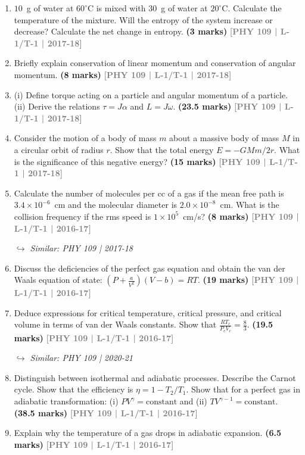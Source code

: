 \documentclass[12pt,a3paper]{article}
\newcommand{\yr}[1]{\hfill\textcolor{gray}{\small\textbf{[#1]}}}
\newcommand{\mk}[1]{\textcolor{orange!70!black}{\small\textbf{(#1 marks)}}}
\newcommand{\variant}[1]{\par\vspace{1pt}\textcolor{blue!50!black}%
  {\footnotesize\textit{$\hookrightarrow$ Similar: #1}}}
\begin{document}
\begin{enumerate}
\item $10$~g of water at $60^\circ$C is mixed with $30$~g of water at $20^\circ$C. Calculate the temperature of the mixture. Will the entropy of the system increase or decrease? Calculate the net change in entropy.
\mk{3} \yr{PHY 109 | L-1/T-1 | 2017-18}

\item Briefly explain conservation of linear momentum and conservation of angular momentum.
\mk{8} \yr{PHY 109 | L-1/T-1 | 2017-18}

\item (i) Define torque acting on a particle and angular momentum of a particle. (ii) Derive the relations $\tau = J\alpha$ and $L = J\omega$.
\mk{23.5} \yr{PHY 109 | L-1/T-1 | 2017-18}

\item Consider the motion of a body of mass $m$ about a massive body of mass $M$ in a circular orbit of radius $r$. Show that the total energy $E = -GMm/2r$. What is the significance of this negative energy?
\mk{15} \yr{PHY 109 | L-1/T-1 | 2017-18}

\item Calculate the number of molecules per cc of a gas if the mean free path is $3.4\times10^{-6}$~cm and the molecular diameter is $2.0\times10^{-8}$~cm. What is the collision frequency if the rms speed is $1\times10^5$~cm/s?
\mk{8} \yr{PHY 109 | L-1/T-1 | 2016-17}
\variant{PHY 109 | 2017-18}

\item Discuss the deficiencies of the perfect gas equation and obtain the van der Waals equation of state: $\left(P + \frac{a}{V^2}\right)(V - b) = RT$.
\mk{19} \yr{PHY 109 | L-1/T-1 | 2016-17}

\item Deduce expressions for critical temperature, critical pressure, and critical volume in terms of van der Waals constants. Show that $\frac{RT_c}{P_c V_c} = \frac{8}{3}$.
\mk{19.5} \yr{PHY 109 | L-1/T-1 | 2016-17}
\variant{PHY 109 | 2020-21}

\item Distinguish between isothermal and adiabatic processes. Describe the Carnot cycle. Show that the efficiency is $\eta = 1 - T_2/T_1$. Show that for a perfect gas in adiabatic transformation: (i) $PV^\gamma = \text{constant}$ and (ii) $TV^{\gamma-1} = \text{constant}$.
\mk{38.5} \yr{PHY 109 | L-1/T-1 | 2016-17}

\item Explain why the temperature of a gas drops in adiabatic expansion.
\mk{6.5} \yr{PHY 109 | L-1/T-1 | 2016-17}


\end{enumerate}
\end{document}
